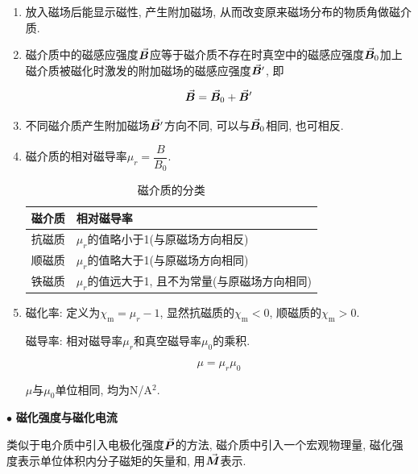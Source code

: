 \begin{enumerate}[itemindent=1em]
	
	\item 放入磁场后能显示磁性, 产生附加磁场, 从而改变原来磁场分布的物质角做磁介质. 
	
	\item 磁介质中的磁感应强度$\va*{B}$应等于磁介质不存在时真空中的磁感应强度$\va*{B}_0$加上磁介质被磁化时激发的附加磁场的磁感应强度$\va*{B}'$, 即
	
	\begin{equation}
		\va*{B} = \va*{B}_0 + \va*{B}' \label{C8-eq23}
	\end{equation}
	
	\item 不同磁介质产生附加磁场$\va*{B}'$方向不同, 可以与$\va*{B}_0$相同, 也可相反. 
	
	\vskip 0.3cm
	
	\item 磁介质的相对磁导率$\mu_r = \dfrac{B}{B_0}$.
	
	\begin{table}[H]
		\centering
		\caption{磁介质的分类}
		\begin{tabular}{cl}
			\toprule[1pt]
			磁介质 & 相对磁导率 \\
			\hline
			抗磁质 & $\mu_r$的值略小于1(与原磁场方向相反) \\
			顺磁质 & $\mu_r$的值略大于1(与原磁场方向相同) \\
			铁磁质 & $\mu_r$的值远大于1, 且不为常量(与原磁场方向相同) \\
			\bottomrule[1pt]
		\end{tabular}
	\end{table}
	
	\item 磁化率: 定义为$\chi_{\textrm{m}} = \mu_r - 1$, 显然抗磁质的$\chi_{\textrm{m}} < 0$, 顺磁质的$\chi_{\textrm{m}} > 0$. 
	
	磁导率: 相对磁导率$\mu_r$和真空磁导率$\mu_0$的乘积. 
	
	\begin{equation}
		\mu = \mu_r \mu_0 \label{C8-eq24}
	\end{equation}

    $\mu$与$\mu_0$单位相同, 均为N/A$^2$.

\end{enumerate}

$\bullet$ \textbf{磁化强度与磁化电流}

类似于电介质中引入电极化强度$\va*{P}$的方法, 磁介质中引入一个宏观物理量, 磁化强度表示单位体积内分子磁矩的矢量和, 用$\va*{M}$表示. 

